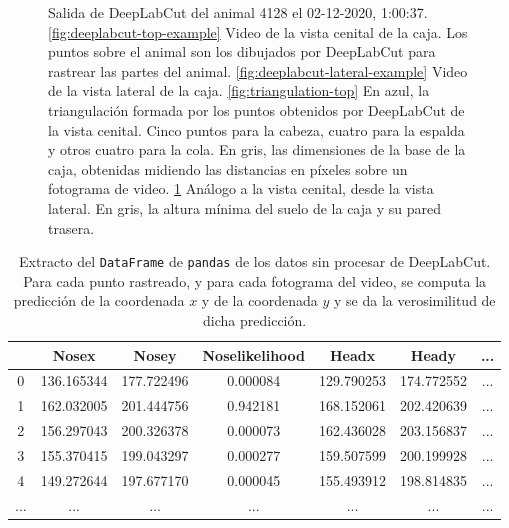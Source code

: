 \begin{figure}[p]
\begin{subfigure}{0.45\textwidth}
    \caption{}
    \label{fig:triangulation-lateral}
  \end{subfigure}
  \caption[Salida de DeepLabCut.]
  {Salida de DeepLabCut del animal 4128 el 02-12-2020, 1:00:37. \ref{fig:deeplabcut-top-example} Video de la vista cenital de la caja. Los puntos sobre el animal son los dibujados por DeepLabCut para rastrear las partes del animal. \ref{fig:deeplabcut-lateral-example} Video de la vista lateral de la caja. \ref{fig:triangulation-top} En azul, la triangulación formada por los puntos obtenidos por DeepLabCut de la vista cenital. Cinco puntos para la cabeza, cuatro para la espalda y otros cuatro para la cola. En gris, las dimensiones de la base de la caja, obtenidas midiendo las distancias en píxeles sobre un fotograma de video. \ref{fig:triangulation-lateral} Análogo a la vista cenital, desde la vista lateral. En gris, la altura mínima del suelo de la caja y su pared trasera.}

  \label{fig:deeplabcut-outputexamples}
\end{figure}

\begin{table}[h]
  \centering
  \begin{tabular}{|c|c|c|c|c|c|c|}
  \hline
    & Nosex & Nosey & Noselikelihood & Headx & Heady & ... \\
  \hline
  0 & 136.165344 & 177.722496 & 0.000084 & 129.790253 & 174.772552 & ... \\
  1 & 162.032005 & 201.444756 & 0.942181 & 168.152061 & 202.420639 & ... \\
  2 & 156.297043 & 200.326378 & 0.000073 & 162.436028 & 203.156837 & ... \\
  3 & 155.370415 & 199.043297 & 0.000277 & 159.507599 & 200.199928 & ... \\
  4 & 149.272644 & 197.677170 & 0.000045 & 155.493912 & 198.814835 & ... \\
  ... & ... & ... & ... & ... & ... & ... \\
  \hline
  \end{tabular}
  \caption[Datos de DeepLabCut]{Extracto del \texttt{DataFrame} de \texttt{pandas} de los datos sin procesar de DeepLabCut. Para cada punto rastreado, y para cada fotograma del video, se computa la predicción de la coordenada $x$ y de la coordenada $y$ y se da la verosimilitud de dicha predicción.}
  \label{tab:df-example}
\end{table}

